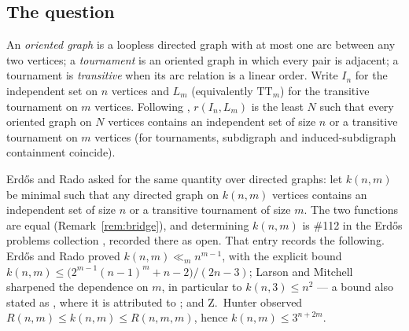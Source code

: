 \documentclass[11pt]{amsart}
\newcommand{\TT}[1]{\mathrm{TT}_{#1}}
\newcommand{\I}[1]{I_{#1}}
\theoremstyle{plain}
\theoremstyle{definition}
\theoremstyle{remark}
\begin{document}
\subsection{The question}\label{ssec:question}
An \emph{oriented graph} is a loopless directed graph with at most one
arc between any two vertices; a \emph{tournament} is an oriented graph
in which every pair is adjacent; a tournament is \emph{transitive} when
its arc relation is a linear order. Write $\I{n}$ for the independent set
on $n$ vertices and $L_m$ (equivalently $\TT{m}$) for the transitive
tournament on $m$ vertices. Following \cite{IRW21}, $r(\I{n},L_m)$ is
the least $N$ such that every oriented graph on $N$ vertices contains an
independent set of size $n$ or a transitive tournament on $m$ vertices
(for tournaments, subdigraph and induced-subdigraph containment
coincide).

Erd\H{o}s and Rado \cite{ErRa67} asked for the same quantity over
directed graphs: let $k(n,m)$ be minimal such that any directed graph on
$k(n,m)$ vertices contains an independent set of size $n$ or a
transitive tournament of size $m$. The two functions are equal
(Remark~\ref{rem:bridge}), and determining $k(n,m)$ is \#112 in the
Erd\H{o}s problems collection \cite{Blo}, recorded there as open.
That entry records the following. Erd\H{o}s and Rado
proved $k(n,m)\ll_m n^{m-1}$, with the explicit bound
$k(n,m)\le\bigl(2^{m-1}(n-1)^m+n-2\bigr)/(2n-3)$; Larson and Mitchell
\cite{LaMi97} sharpened the dependence on $m$, in particular to
$k(n,3)\le n^2$ --- a bound also stated as
\cite[Lemma~2.4]{IRW21}, where it is attributed to \cite{LaMi97}; and
Z.~Hunter observed
$R(n,m)\le k(n,m)\le R(n,m,m)$, hence $k(n,m)\le 3^{n+2m}$.
\end{document}
